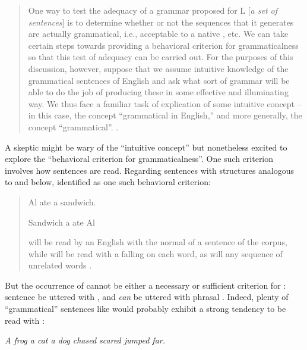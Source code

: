 \begin{quote}
One way to test the adequacy of a grammar proposed for L [\textit{a set of sentences}] is to determine whether or not the sequences that it generates are actually grammatical, i.e., acceptable to a native , etc. We can take certain steps towards providing a behavioral criterion for grammaticalness so that this test of adequacy can be carried out. For the purposes of this discussion, however, suppose that we assume intuitive knowledge of the grammatical sentences of English and ask what sort of grammar will be able to do the job of producing these in some effective and illuminating way. We thus face a familiar task of explication of some intuitive concept -- in this case, the concept “grammatical in English,” and more generally, the concept “grammatical”. \citep[13]{Chomsky1957}.
\end{quote}

  A skeptic might be wary of the “intuitive concept” but nonetheless excited to explore the “behavioral criterion for grammaticalness”. One such criterion involves how sentences are read. Regarding sentences with structures analogous to  and  below, \citet{Chomsky1956} identified  as one such behavioral criterion:

\begin{quote} 
  
\ea\label{ex:6:1}
Al ate a sandwich.
\z


\ea\label{ex:6:2}
Sandwich a ate Al%
\z

 will be read by an English  with the normal  of a sentence of the corpus, while  will be read with a falling  on each word, as will any sequence of unrelated words \citep[114]{Chomsky1956}.

\end{quote}


  But the occurrence of  cannot be either a necessary or sufficient criterion for : sentence   be uttered with , and  \textit{can} be uttered with phrasal . Indeed, plenty of “grammatical” sentences like  would probably exhibit a strong tendency to be read with : 

\ea\label{ex:6:3}
\textit{A frog a cat a dog chased scared jumped far.}
\z

